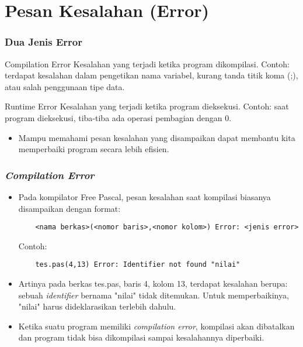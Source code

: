 \section{Pesan Kesalahan (Error)}
\frame{\sectionpage}

\begin{frame}
\frametitle{Dua Jenis Error}
\begin{block}{Compilation Error}
  Kesalahan yang terjadi ketika program dikompilasi.\newline
  Contoh: terdapat kesalahan dalam pengetikan nama variabel, kurang tanda titik koma (;), atau salah penggunaan tipe data.
\end{block}
\begin{block}{Runtime Error}
  Kesalahan yang terjadi ketika program dieksekusi.\newline
  Contoh: saat program dieksekusi, tiba-tiba ada operasi pembagian dengan 0.
\end{block}

\begin{itemize}
  \item Mampu memahami pesan kesalahan yang disampaikan dapat membantu kita memperbaiki program secara lebih efisien.
\end{itemize}
\end{frame}

\begin{frame}[fragile]
\frametitle{\textit{Compilation Error}}
\begin{itemize}
  \item Pada kompilator Free Pascal, pesan kesalahan saat kompilasi biasanya disampaikan dengan format:
  \begin{lstlisting}
    <nama berkas>(<nomor baris>,<nomor kolom>) Error: <jenis error>
  \end{lstlisting}
  Contoh:
  \begin{lstlisting}
    tes.pas(4,13) Error: Identifier not found "nilai"
  \end{lstlisting}
  \item Artinya pada berkas tes.pas, baris 4, kolom 13, terdapat kesalahan berupa: sebuah \textit{identifier} bernama "nilai" tidak ditemukan. Untuk memperbaikinya, "nilai" harus dideklarasikan terlebih dahulu.
  \item Ketika suatu program memiliki \textit{compilation error}, kompilasi akan dibatalkan dan program tidak bisa dikompilasi sampai kesalahannya diperbaiki.
\end{itemize}
\end{frame}

